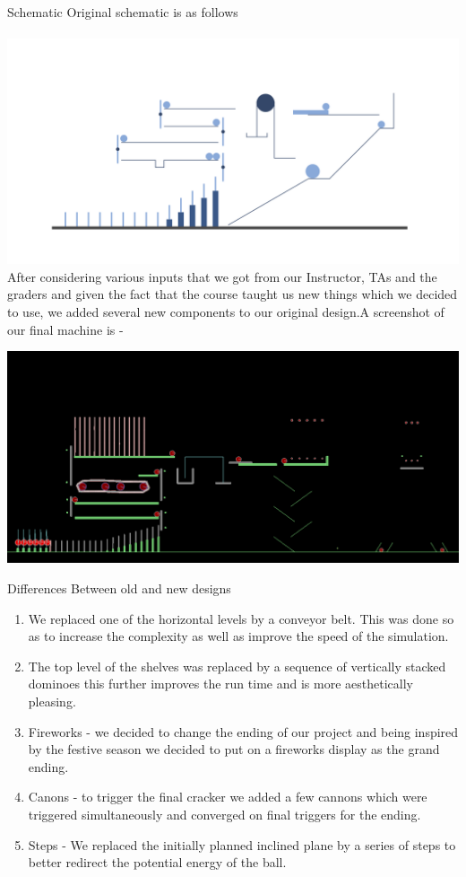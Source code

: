 \documentclass[a4paper,12pt]{article}
\begin{document}
\begin{section}{Schematic}
Original schematic is as follows \\
\\
\includegraphics[scale=1.55]{./Images/rect3049.png}
\\
After considering various inputs that we got from our Instructor, TAs and the graders and given the fact that the course taught us new things which we decided to use, we added several new components to our original design.A screenshot of our final machine is - \\
\begin{center}
\includegraphics[scale=0.3]{./Images/FinalDesign.png}
\end{center}
\begin{subsection}{Differences Between old and new designs}
\begin{enumerate}
\item We replaced one of the horizontal levels by a conveyor belt. This was done so as to increase the complexity as well as improve the speed of the simulation.
\item The  top level of the shelves was replaced by a sequence of  vertically stacked dominoes this further improves the run time and is more aesthetically pleasing.
\item Fireworks - we decided to change the ending of our project and being inspired by the festive season we decided to put on a fireworks display as the grand ending.
\item Canons - to trigger the final cracker we added a few cannons which were triggered simultaneously and converged on final triggers for the ending.
\item Steps - We replaced the initially planned inclined plane by a series of steps to better redirect the potential energy of the ball.
\end{enumerate}
\end{subsection}
\end{section}
\bigskip
\end{document}
